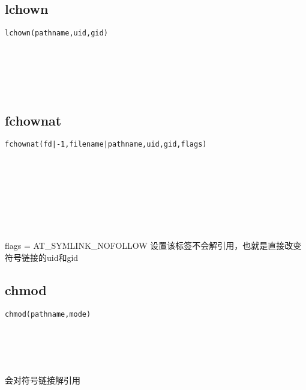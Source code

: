 \documentclass[10pt,a4paper]{article}
\begin{document}
\subsection{lchown}
\begin{spacing}{2.0}
\lstset{language=C,numbers=none}
\begin{lstlisting}
lchown(pathname,uid,gid)
\end{lstlisting}
{\large\color[rgb]{0.2,0.4,0.6}{pathname:}} \\
{\large\color[rgb]{0.2,0.4,0.6}{uid:}} \\
{\large\color[rgb]{0.2,0.4,0.6}{gid:}}
\paragraph{ \ \ }
\end{spacing}

\subsection{fchownat}
\begin{spacing}{2.0}
\lstset{language=C,numbers=none}
\begin{lstlisting}
fchownat(fd|-1,filename|pathname,uid,gid,flags)
\end{lstlisting}
{\large\color[rgb]{0.2,0.4,0.6}{fd|-1:}} \\
{\large\color[rgb]{0.2,0.4,0.6}{filename|pathname:}} \\
{\large\color[rgb]{0.2,0.4,0.6}{uid:}} \\
{\large\color[rgb]{0.2,0.4,0.6}{gid:}} \\
{\large\color[rgb]{0.2,0.4,0.6}{flags:}}
\paragraph{ \ \ }flags = AT\_SYMLINK\_NOFOLLOW 设置该标签不会解引用，也就是直接改变符号链接的uid和gid
\end{spacing}

\subsection{chmod}
\begin{spacing}{2.0}
\lstset{language=C,numbers=none}
\begin{lstlisting}
chmod(pathname,mode)
\end{lstlisting}
{\large\color[rgb]{0.2,0.4,0.6}{pathname:}} \\
{\large\color[rgb]{0.2,0.4,0.6}{mode:}}
\paragraph{ \ \ }会对符号链接解引用
\end{spacing}
\end{document}
